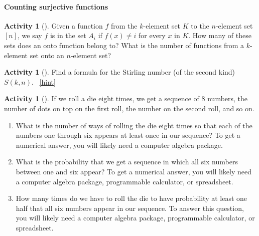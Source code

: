 \documentclass[10pt,]{book}
\theoremstyle{plain}
\theoremstyle{definition}
\theoremstyle{definition}
\theoremstyle{definition}
\newtheorem{activity}[project]{Activity}
\numberwithin{equation}{chapter}
\begin{document}
\paragraph[{Counting surjective functions}]{Counting surjective functions}\hypertarget{paragraphs-5}{}
\begin{activity}[]\label{numontofun}
\hypertarget{p-810}{}%
Given a function \(f\) from the \(k\)-element set \(K\) to the \(n\)-element set \([n]\), we say \(f\) is in the set \(A_i\) if \(f(x)\not= i\) for every \(x\) in \(K\). How many of these  sets does an onto function belong to? What is the number of functions from a \(k\)-element set onto an \(n\)-element set?%
\end{activity}
\begin{activity}[]\label{act_stirlingpie}
\hypertarget{p-812}{}%
Find a formula for the Stirling number (of the second kind) \(S(k,n)\).%
~\hfill{\tiny\hyperlink{a-169}{[hint]}\hypertarget{q-169}{}}\end{activity}
\begin{activity}[]\label{activity-170}
\hypertarget{p-815}{}%
If we roll a die eight times, we get a sequence of 8 numbers, the number of dots on top on the first roll, the number on the second roll, and so on.%
\begin{enumerate}[font=\bfseries,label=(\alph*),ref=\alph*]
\item\label{task-161} \hypertarget{p-816}{}%
What is the number of ways of rolling the die eight times so that each of the numbers one through six appears at least once in our sequence? To get a numerical answer, you will likely need a computer algebra package.%
\item\label{task-162} \hypertarget{p-818}{}%
What is the probability that we get a sequence in which all six numbers between one and six appear? To get a numerical answer, you will likely need a computer algebra package, programmable calculator, or spreadsheet.%
\item\label{task-163} \hypertarget{p-820}{}%
How many times do we have to roll the die to have probability at least one half that all six numbers appear in our sequence. To answer this question, you will likely need a computer algebra package, programmable calculator, or spreadsheet.%
\end{enumerate}
\end{activity}
\typeout{************************************************}
\typeout{************************************************}
\end{document}
